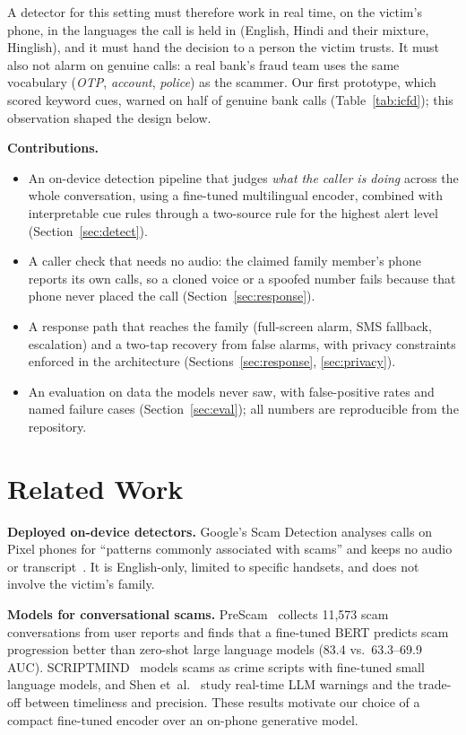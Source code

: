 \documentclass[conference,a4paper]{IEEEtran}
\begin{document}
A detector for this setting must therefore work in real time, on the victim's phone, in the languages the call is
held in (English, Hindi and their mixture, Hinglish), and it must hand the decision to a person the victim trusts.
It must also not alarm on genuine calls: a real bank's fraud team uses the same vocabulary (\emph{OTP},
\emph{account}, \emph{police}) as the scammer. Our first prototype, which scored keyword cues, warned on half of
genuine bank calls (Table~\ref{tab:icfd}); this observation shaped the design below.

\textbf{Contributions.}
\begin{itemize}
\item An on-device detection pipeline that judges \emph{what the caller is doing} across the whole conversation,
using a fine-tuned multilingual encoder, combined with interpretable cue rules through a two-source rule for the
highest alert level (Section~\ref{sec:detect}).
\item A caller check that needs no audio: the claimed family member's phone reports its own calls, so a cloned voice
or a spoofed number fails because that phone never placed the call (Section~\ref{sec:response}).
\item A response path that reaches the family (full-screen alarm, SMS fallback, escalation) and a two-tap recovery
from false alarms, with privacy constraints enforced in the architecture (Sections~\ref{sec:response}, \ref{sec:privacy}).
\item An evaluation on data the models never saw, with false-positive rates and named failure cases
(Section~\ref{sec:eval}); all numbers are reproducible from the repository.
\end{itemize}

\section{Related Work}

\textbf{Deployed on-device detectors.} Google's Scam Detection analyses calls on Pixel phones for ``patterns commonly
associated with scams'' and keeps no audio or transcript~\cite{google}. It is English-only, limited to specific
handsets, and does not involve the victim's family.

\textbf{Models for conversational scams.} PreScam~\cite{prescam} collects 11{,}573 scam conversations from user
reports and finds that a fine-tuned BERT predicts scam progression better than zero-shot large language models
(83.4 vs.\ 63.3--69.9 AUC). SCRIPTMIND~\cite{scriptmind} models scams as crime scripts with fine-tuned small
language models, and Shen et~al.~\cite{shen} study real-time LLM warnings and the trade-off between timeliness and
precision. These results motivate our choice of a compact fine-tuned encoder over an on-phone generative model.
\end{document}
